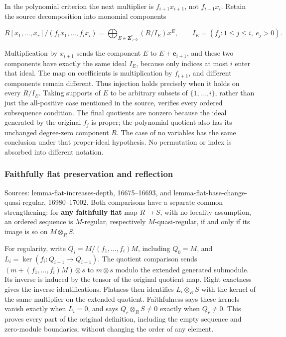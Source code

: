 In the polynomial criterion the next multiplier is \(f_{i+1}x_{i+1}\), not \(f_{i+1}x_i\). Retain the source decomposition into monomial components

\[
R[x_1,\ldots,x_r]/(f_1x_1,\ldots,f_ix_i)
=\bigoplus_{E\in\mathbf Z_{\geq0}^r}(R/I_E)x^E,
\qquad I_E=(f_j:1\leq j\leq i,\ e_j>0).
\]

Multiplication by \(x_{i+1}\) sends the component \(E\) to \(E+\mathbf e_{i+1}\), and these two components have exactly the same ideal \(I_E\), because only indices at most \(i\) enter that ideal. The map on coefficients is multiplication by \(f_{i+1}\), and different components remain different. Thus injection holds precisely when it holds on every \(R/I_E\). Taking supports of \(E\) to be arbitrary subsets of \(\{1,\ldots,i\}\), rather than just the all-positive case mentioned in the source, verifies every ordered subsequence condition. The final quotients are nonzero because the ideal generated by the original \(f_j\) is proper; the polynomial quotient also has its unchanged degree-zero component \(R\). The case of no variables has the same conclusion under that proper-ideal hypothesis. No permutation or index is absorbed into different notation.

\subsubsection{Faithfully flat preservation and reflection}\label{algebra-proof-006-faithfully-flat-preservation-and-reflection}

Sources: lemma-flat-increases-depth, 16675--16693, and lemma-flat-base-change-quasi-regular, 16980--17002. Both comparisons have a separate common strengthening: for \textbf{any faithfully flat} map \(R\to S\), with no locality assumption, an ordered sequence is \(M\)-regular, respectively \(M\)-quasi-regular, if and only if its image is so on \(M\otimes_RS\).

For regularity, write \(Q_i=M/(f_1,\ldots,f_i)M\), including \(Q_0=M\), and \(L_i=\ker(f_i:Q_{i-1}\to Q_{i-1})\). The quotient comparison sends \((m+(f_1,\ldots,f_i)M)\otimes s\) to \(m\otimes s\) modulo the extended generated submodule. Its inverse is induced by the tensor of the original quotient map. Right exactness gives the inverse identifications. Flatness then identifies \(L_i\otimes_RS\) with the kernel of the same multiplier on the extended quotient. Faithfulness says these kernels vanish exactly when \(L_i=0\), and says \(Q_r\otimes_RS\ne0\) exactly when \(Q_r\ne0\). This proves every part of the original definition, including the empty sequence and zero-module boundaries, without changing the order of any element.

